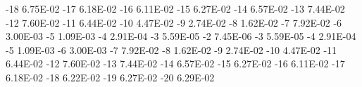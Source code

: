 
-18	6.75E-02
-17	6.18E-02
-16	6.11E-02
-15	6.27E-02
-14	6.57E-02
-13	7.44E-02
-12	7.60E-02
-11	6.44E-02
-10	4.47E-02
-9	2.74E-02
-8	1.62E-02
-7	7.92E-02
-6	3.00E-03
-5	1.09E-03
-4	2.91E-04
-3	5.59E-05
-2	7.45E-06
-3	5.59E-05
-4	2.91E-04
-5	1.09E-03
-6	3.00E-03
-7	7.92E-02
-8	1.62E-02
-9	2.74E-02
-10	4.47E-02
-11	6.44E-02
-12	7.60E-02
-13	7.44E-02
-14	6.57E-02
-15	6.27E-02
-16	6.11E-02
-17	6.18E-02
-18	6.22E-02
-19	6.27E-02
-20	6.29E-02
